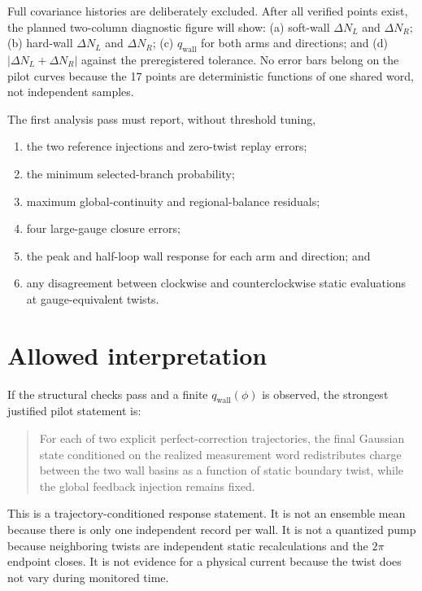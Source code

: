 \documentclass[aps,prb,twocolumn,floatfix,nofootinbib,superscriptaddress]{revtex4-2}
\begin{document}
Full covariance histories are deliberately excluded.  After all verified
points exist, the planned two-column diagnostic figure will show: (a) soft-wall
$\Delta N_L$ and $\Delta N_R$; (b) hard-wall $\Delta N_L$ and
$\Delta N_R$; (c) $q_{\mathrm{wall}}$ for both arms and directions; and
(d) $|\Delta N_L+\Delta N_R|$ against the preregistered tolerance.  No error
bars belong on the pilot curves because the 17 points are deterministic
functions of one shared word, not independent samples.

The first analysis pass must report, without threshold tuning,

\begin{enumerate}
  \item the two reference injections and zero-twist replay errors;
  \item the minimum selected-branch probability;
  \item maximum global-continuity and regional-balance residuals;
  \item four large-gauge closure errors;
  \item the peak and half-loop wall response for each arm and direction; and
  \item any disagreement between clockwise and counterclockwise static
  evaluations at gauge-equivalent twists.
\end{enumerate}

\section{Allowed interpretation}

If the structural checks pass and a finite $q_{\mathrm{wall}}(\phi)$ is
observed, the strongest justified pilot statement is:
\begin{quote}
For each of two explicit perfect-correction trajectories, the final Gaussian
state conditioned on the realized measurement word redistributes charge
between the two wall basins as a function of static boundary twist, while the
global feedback injection remains fixed.
\end{quote}

This is a trajectory-conditioned response statement.  It is not an ensemble
mean because there is only one independent record per wall.  It is not a
quantized pump because neighboring twists are independent static
recalculations and the $2\pi$ endpoint closes.  It is not evidence for a
physical current because the twist does not vary during monitored time.
\end{document}
